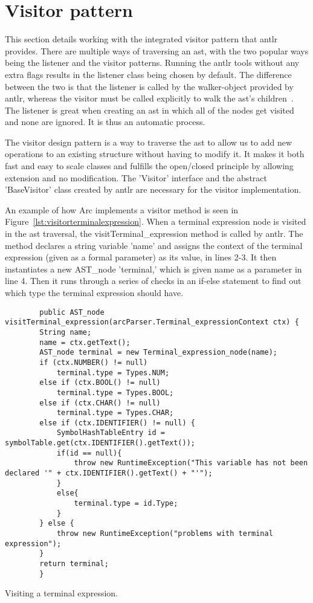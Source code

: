 \section{Visitor pattern}\label{sec:visitorpattern}
This section details working with the integrated visitor pattern that \gls{antlr} provides. There are multiple ways of traversing an \gls{ast}, with the two popular ways being the listener and the visitor patterns. Running the \gls{antlr} tools without any extra flags results in the listener class being chosen by default. The difference between the two is that the listener is called by the walker-object provided by \gls{antlr}, whereas the visitor must be called explicitly to walk the \gls{ast}'s children~\cite{Parr2014}. The listener is great when creating an \gls{ast} in which all of the nodes get visited and none are ignored. It is thus an automatic process.

The visitor design pattern is a way to traverse the \gls{ast} to allow us to add new operations to an existing structure without having to modify it. It makes it both fast and easy to scale classes and fulfills the open/closed principle by allowing extension and no modification. The 'Visitor' interface and the abstract 'BaseVisitor' class created by \gls{antlr} are necessary for the visitor implementation.

An example of how Arc implements a visitor method is seen in Figure~\ref{lst:visitorterminalexpression}. When a terminal expression node is visited in the \gls{ast} traversal, the visitTerminal\_expression method is called by \gls{antlr}. The method declares a string variable 'name' and assigns the context of the terminal expression (given as a formal parameter) as its value, in lines 2-3. It then instantiates a new AST\_node 'terminal,' which is given name as a parameter in line 4. Then it runs through a series of checks in an if-else statement to find out which type the terminal expression should have. 


\begin{listing}[htb!]
    \begin{verbatim}
        public AST_node visitTerminal_expression(arcParser.Terminal_expressionContext ctx) {
        String name;
        name = ctx.getText();
        AST_node terminal = new Terminal_expression_node(name);
        if (ctx.NUMBER() != null)
            terminal.type = Types.NUM;
        else if (ctx.BOOL() != null)
            terminal.type = Types.BOOL;
        else if (ctx.CHAR() != null)
            terminal.type = Types.CHAR;
        else if (ctx.IDENTIFIER() != null) {
            SymbolHashTableEntry id = symbolTable.get(ctx.IDENTIFIER().getText());
            if(id == null){
                throw new RuntimeException("This variable has not been declared '" + ctx.IDENTIFIER().getText() + "'");
            }
            else{
                terminal.type = id.Type;
            }
        } else {
            throw new RuntimeException("problems with terminal expression");
        }
        return terminal;
        }
    \end{verbatim}
    \caption{Visiting a terminal expression.}
    \label{lst:visitorterminalexpression}
\end{listing}


